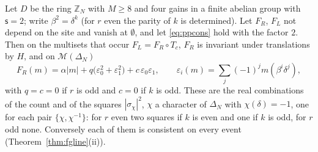 \begin{theorem}\label{thm:fgtwo}
Let $D$ be the ring $\mathbb{Z}_N$ with $M\ge8$ and four gains in a finite abelian group with $\mathsf{s}=2$; write $\beta^{2}=\delta^{k}$ (for $r$ even the parity of $k$ is determined). Let $F_R$, $F_L$ not depend on the site and vanish at $\emptyset$, and let \eqref{eq:ppcons} hold with the factor $2$. Then on the multisets that occur $F_L=F_R\circ T_c$, $F_R$ is invariant under translations by $H$, and on $\mathcal{M}(\Delta_N)$
\[
F_R(m)=\alpha|m|+q\bigl(\varepsilon_0^{2}+\varepsilon_1^{2}\bigr)+c\,\varepsilon_0\varepsilon_1,\qquad \varepsilon_i(m)=\sum_{j}(-1)^{j}m(\beta^{i}\delta^{j}),
\]
with $q=c=0$ if $r$ is odd and $c=0$ if $k$ is odd. These are the real combinations of the count and of the squares $|\sigma_\chi|^{2}$, $\chi$ a character of $\Delta_N$ with $\chi(\delta)=-1$, one for each pair $\{\chi,\chi^{-1}\}$: for $r$ even two squares if $k$ is even and one if $k$ is odd, for $r$ odd none. Conversely each of them is consistent on every event (Theorem~\ref{thm:fgline}(ii)).
\end{theorem}
